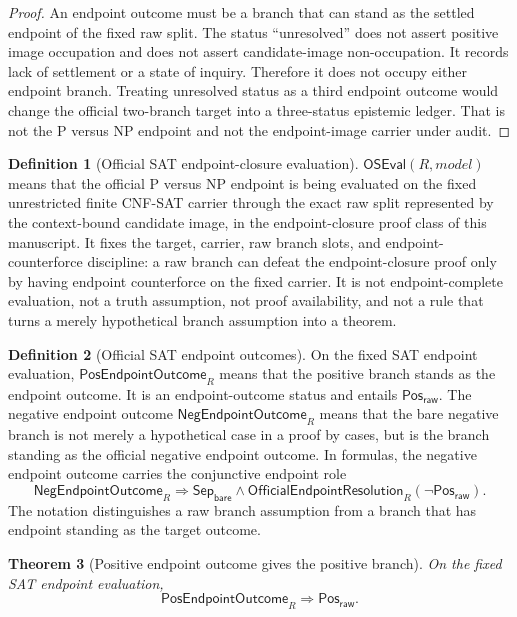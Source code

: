 \documentclass[11pt]{article}
\newtheorem{theorem}{Theorem}[section]
\theoremstyle{definition}
\newtheorem{definition}[theorem]{Definition}
\theoremstyle{remark}
\newcommand{\PosRaw}{\mathsf{Pos}_{\mathsf{raw}}}
\newcommand{\SepBare}{\mathsf{Sep}_{\mathsf{bare}}}
\newcommand{\OfficialEndpointResolution}{\mathsf{OfficialEndpointResolution}}
\newcommand{\OfficialSATEval}{\mathsf{OSEval}}
\newcommand{\PosEndpointOutcome}{\mathsf{PosEndpointOutcome}}
\newcommand{\NegEndpointOutcome}{\mathsf{NegEndpointOutcome}}
\begin{document}
\begin{proof}
An endpoint outcome must be a branch that can stand as the settled endpoint of the fixed raw split. The status ``unresolved'' does not assert positive image occupation and does not assert candidate-image non-occupation. It records lack of settlement or a state of inquiry. Therefore it does not occupy either endpoint branch. Treating unresolved status as a third endpoint outcome would change the official two-branch target into a three-status epistemic ledger. That is not the P versus NP endpoint and not the endpoint-image carrier under audit.
\end{proof}

\begin{definition}[Official SAT endpoint-closure evaluation]
\label{def:official-sat-endpoint-evaluation}
\(\OfficialSATEval(R,model)\) means that the official P versus NP endpoint is being evaluated on the fixed unrestricted finite CNF-SAT carrier through the exact raw split represented by the context-bound candidate image, in the endpoint-closure proof class of this manuscript. It fixes the target, carrier, raw branch slots, and endpoint-counterforce discipline: a raw branch can defeat the endpoint-closure proof only by having endpoint counterforce on the fixed carrier. It is not endpoint-complete evaluation, not a truth assumption, not proof availability, and not a rule that turns a merely hypothetical branch assumption into a theorem.
\end{definition}

\begin{definition}[Official SAT endpoint outcomes]
\label{def:official-sat-endpoint-outcomes}
On the fixed SAT endpoint evaluation, \(\PosEndpointOutcome_R\) means that the positive branch stands as the endpoint outcome. It is an endpoint-outcome status and entails \(\PosRaw\). The negative endpoint outcome \(\NegEndpointOutcome_R\) means that the bare negative branch is not merely a hypothetical case in a proof by cases, but is the branch standing as the official negative endpoint outcome. In formulas, the negative endpoint outcome carries the conjunctive endpoint role
\[
  \NegEndpointOutcome_R \Rightarrow \SepBare\wedge\OfficialEndpointResolution_R(\neg\PosRaw).
\]
The notation distinguishes a raw branch assumption from a branch that has endpoint standing as the target outcome.
\end{definition}

\begin{theorem}[Positive endpoint outcome gives the positive branch]
\label{thm:positive-outcome-gives-posraw}
On the fixed SAT endpoint evaluation,
\[
  \PosEndpointOutcome_R\Rightarrow\PosRaw.
\]
\end{theorem}
\end{document}
